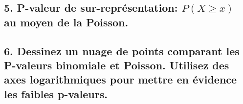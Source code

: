 \documentclass[]{article}
\newenvironment{Shaded}{\begin{snugshade}}{\end{snugshade}}
\newcommand{\KeywordTok}[1]{\textcolor[rgb]{0.94,0.87,0.69}{#1}}
\newcommand{\DataTypeTok}[1]{\textcolor[rgb]{0.87,0.87,0.75}{#1}}
\newcommand{\DecValTok}[1]{\textcolor[rgb]{0.86,0.86,0.80}{#1}}
\newcommand{\StringTok}[1]{\textcolor[rgb]{0.80,0.58,0.58}{#1}}
\newcommand{\OtherTok}[1]{\textcolor[rgb]{0.94,0.94,0.56}{#1}}
\newcommand{\OperatorTok}[1]{\textcolor[rgb]{0.94,0.94,0.82}{#1}}
\newcommand{\NormalTok}[1]{\textcolor[rgb]{0.80,0.80,0.80}{#1}}
\begin{document}
\subsection{\texorpdfstring{5. P-valeur de sur-représentation:
\(P(X \ge x)\) au moyen de la
Poisson.}{5. P-valeur de sur-représentation: P(X \textbackslash{}ge x) au moyen de la Poisson.}}\label{p-valeur-de-sur-representation-px-ge-x-au-moyen-de-la-poisson.}

\begin{Shaded}
\end{Shaded}

\subsection{6. Dessinez un nuage de points comparant les P-valeurs
binomiale et Poisson. Utilisez des axes logarithmiques pour mettre en
évidence les faibles
p-valeurs.}\label{dessinez-un-nuage-de-points-comparant-les-p-valeurs-binomiale-et-poisson.-utilisez-des-axes-logarithmiques-pour-mettre-en-evidence-les-faibles-p-valeurs.}

\begin{Shaded}
\end{Shaded}
\end{document}
